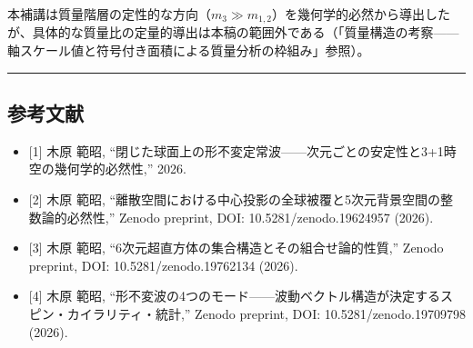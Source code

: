 \documentclass[
  a4paper,11pt]{ltjsarticle}
\providecommand{\tightlist}{%
  \setlength{\itemsep}{0pt}\setlength{\parskip}{0pt}}
\begin{document}
本補講は質量階層の定性的な方向（\(m_3 \gg m_{1,2}\)）を幾何学的必然から導出したが、具体的な質量比の定量的導出は本稿の範囲外である（「質量構造の考察------軸スケール値と符号付き面積による質量分析の枠組み」参照）。

\begin{center}\rule{0.5\linewidth}{0.5pt}\end{center}

\subsection{参考文献}\label{ux53c2ux8003ux6587ux732e}

\begin{itemize}
\tightlist
\item
  {[}1{]} 木原 範昭,
  ``閉じた球面上の形不変定常波------次元ごとの安定性と3+1時空の幾何学的必然性,''
  2026.
\item
  {[}2{]} 木原 範昭,
  ``離散空間における中心投影の全球被覆と5次元背景空間の整数論的必然性,''
  Zenodo preprint, DOI: 10.5281/zenodo.19624957 (2026).
\item
  {[}3{]} 木原 範昭, ``6次元超直方体の集合構造とその組合せ論的性質,''
  Zenodo preprint, DOI: 10.5281/zenodo.19762134 (2026).
\item
  {[}4{]} 木原 範昭,
  ``形不変波の4つのモード------波動ベクトル構造が決定するスピン・カイラリティ・統計,''
  Zenodo preprint, DOI: 10.5281/zenodo.19709798 (2026).
\end{itemize}
\end{document}
